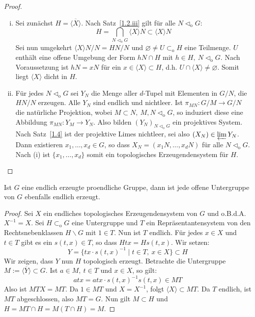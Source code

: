 \documentclass[11pt,a4paper,openany]{memoir}
\begin{document}
\begin{proof}
\begin{enumerate}[(i)]
\item Sei zunächst $H=\overline{\langle X\rangle}$. Nach Satz~\ref{1.2.iii} gilt für alle $N\lhd_\text{o}G$:
\[ H=\bigcap_{N\lhd_\text{o}G} \langle X \rangle N \subset \langle X\rangle N\]
Sei nun umgekehrt $\langle X\rangle N/N=HN/N$ und $\varnothing\neq U\subset_\text{o}H$ eine Teilmenge. $U$ enthält eine offene Umgebung der Form $hN\cap H$ mit $h\in H,\ N\lhd_\text{o}G$. Nach Voraussetzung ist $hN=xN$ für ein $x\in\langle X\rangle\subset H$, d.h. $U\cap\langle X\rangle \neq\varnothing$. Somit liegt $\langle X\rangle$ dicht in $H$.
\item Für jedes $N\lhd_\text{o}G$ sei $Y_N$ die Menge aller $d$-Tupel mit Elementen in $G/N$, die $HN/N$ erzeugen. Alle $Y_N$ sind endlich und nichtleer. Ist $\pi_{MN}:G/M\to G/N$ die natürliche Projektion, wobei $M\subset N,\ M,N\lhd_\text{o}G$, so induziert diese eine Abbildung $\pi_{MN}: Y_M\to Y_N$. Also bilden $(Y_N)_{N\lhd_\text{o}G}$ ein projektives System. Nach Satz~\ref{1.4} ist der projektive Limes nichtleer, sei also $(X_N)\in\varprojlim Y_N$. Dann existieren $x_1,\ldots,x_d\in G$, so dass $X_N=(x_1N,\ldots,x_dN)$ für alle $N\lhd_\text{o}G$. Nach (i) ist $\{x_1,\ldots,x_d\}$ somit ein topologisches Erzeugendensystem für $H$. \qedhere
\end{enumerate}
\end{proof}
\fi

\begin{proposition}\label{1.7}
Ist $G$ eine endlich erzeugte proendliche Gruppe, dann ist jede offene Untergruppe von $G$ ebenfalls endlich erzeugt.
\end{proposition}

\begin{proof}
Sei $X$ ein endliches topologisches Erzeugendensystem von $G$ und o.B.d.A. $X^{-1}=X$. Sei $H\subset_\text{o}G$ eine Untergruppe und $T$ ein Repräsentantensystem von den Rechtsnebenklassen $H\backslash G$ mit $1\in T$. Nun ist $T$ endlich. Für jedes $x\in X$ und $t\in T$ gibt es ein $s(t,x)\in T$, so dass $Htx=Hs(t,x)$. Wir setzen:
\[Y=\{tx\cdot s(t,x)^{-1}\mid t\in T,\ x\in X \}\subset H \]
Wir zeigen, dass $Y$ nun $H$ topologisch erzeugt. Betrachte die Untergruppe $M:=\overline{\langle Y\rangle}\subset G$. Ist $a\in M,\ t\in T$ und $x\in X$, so gilt:
\[atx=atx\cdot s(t,x)^{-1} s(t,x)\in MT \]
Also ist $MTX=MT$. Da $1\in MT$ und $X=X^{-1}$, folgt $\langle X\rangle\subset MT$. Da $T$ endlich, ist $MT$ abgeschlossen, also $MT=G$. Nun gilt $M\subset H$ und $H=MT\cap H=M(T\cap H)=M$.
\end{proof}
\end{document}

